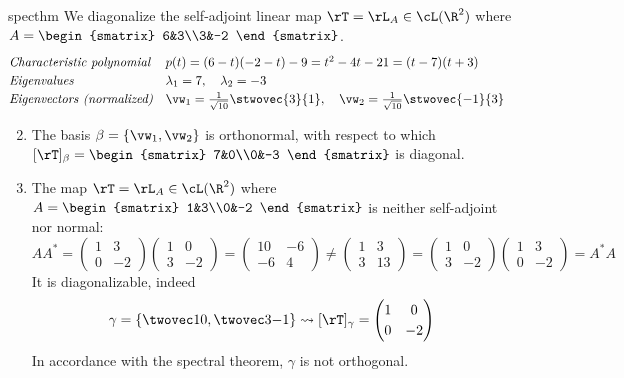 \begin{examples}{}{specthm}
\exstart We diagonalize the self-adjoint linear map $\rT=\rL_A\in\cL(\R^2)$ where $A=\begin{smatrix}
	6&3\\3&-2
	\end{smatrix}$.
	\[\def\arraystretch{1.2}\begin{array}{@{}ll}
		\text{\emph{Characteristic polynomial}} &p(t)=(6-t)(-2-t)-9=t^2-4t-21=(t-7)(t+3)\\
		\text{\emph{Eigenvalues}} &\lambda_1=7,\quad \lambda_2=-3\\
		\text{\emph{Eigenvectors (normalized)}} &\vw_1=\frac 1{\sqrt{10}}\stwovec{3}{1},\quad \vw_2=\frac 1{\sqrt{10}}\stwovec{-1}{3}
	\end{array}\]
\begin{enumerate}\setcounter{enumi}{1}
	\item[]	The basis $\beta=\{\vw_1,\vw_2\}$ is orthonormal, with respect to which $[\rT]_\beta=\begin{smatrix}
	7&0\\0&-3
	\end{smatrix}$ is diagonal.
	
  \item\label{ex:schur1} The map $\rT=\rL_A\in\cL(\R^2)$ where $A=\begin{smatrix}
	1&3\\0&-2
	\end{smatrix}$ is neither self-adjoint nor normal:
	\[AA^*=\begin{pmatrix}
	1&3\\0&-2
	\end{pmatrix}\begin{pmatrix}
	1&0\\3&-2
	\end{pmatrix}
	=
	\begin{pmatrix}
	10&-6\\-6&4
	\end{pmatrix}
	\neq \begin{pmatrix}
	1&3\\3&13
	\end{pmatrix}
	=
	\begin{pmatrix}
	1&0\\3&-2
	\end{pmatrix}\begin{pmatrix}
	1&3\\0&-2
	\end{pmatrix}
	=A^*A\]
	It is diagonalizable, indeed
	\[\gamma=\left\{\twovec 10,\twovec 3{-1}\right\} \rightsquigarrow [\rT]_\gamma=\begin{pmatrix}
	1&0\\0&-2
	\end{pmatrix}\]
	In accordance with the spectral theorem, $\gamma$ is not orthogonal.
	

\end{enumerate}
\end{examples}
